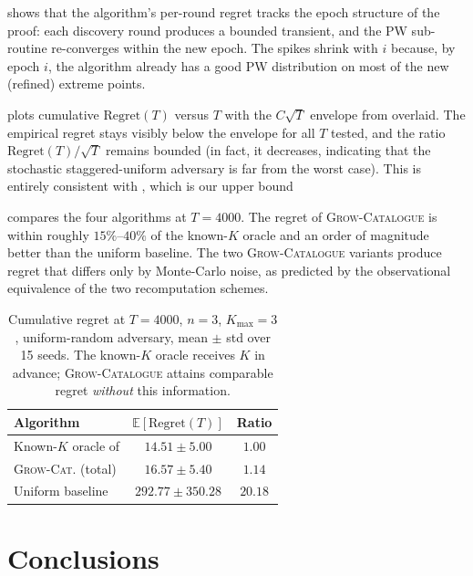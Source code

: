 \documentclass[letterpaper,9pt,twocolumn]{extarticle}
\newcommand{\EE}{\mathbb{E}}
\newcommand{\Kmax}{K_{\max}}
\newcommand{\Regret}{\mathrm{Regret}}
\theoremstyle{plain}
\theoremstyle{definition}
\theoremstyle{remark}
\begin{document}
 shows that the algorithm's per-round regret tracks
the epoch structure of the proof: each discovery round produces a bounded
transient, and the PW sub-routine re-converges within the new epoch. The
spikes shrink with $i$ because, by epoch $i$, the algorithm already has a
good PW distribution on most of the new (refined) extreme points.

 plots cumulative $\Regret(T)$ versus $T$ with the
$C\sqrt T$ envelope from  overlaid. The empirical regret
stays visibly below the envelope for all $T$ tested, and the ratio
$\Regret(T)/\sqrt T$ remains bounded (in fact, it decreases, indicating
that the stochastic staggered-uniform adversary is far from the worst
case). This is entirely consistent with , which is our upper bound

 compares the four algorithms at $T=4000$. The regret
of \textsc{Grow-Catalogue} is
within roughly $15\%$--$40\%$ of the known-$K$ oracle and an order of
magnitude better than the uniform baseline. The two \textsc{Grow-Catalogue}
variants produce regret that differs only by Monte-Carlo noise, as
predicted by the observational equivalence of the two recomputation
schemes.

\begin{table}[h]
\centering
\footnotesize
\renewcommand{\arraystretch}{1.15}
\begin{tabular}{lcc}
\toprule
Algorithm & $\EE[\Regret(T)]$ & Ratio\\
\midrule
Known-$K$ oracle of \citet{balcan2015} & $14.51\pm 5.00$  & $1.00$\\
\textsc{Grow-Cat.} (total)     & $16.57\pm 5.40$  & $1.14$\\
Uniform baseline               & $292.77\pm 350.28$ & $20.18$\\
\bottomrule
\end{tabular}
\caption{Cumulative regret at $T=4000$, $n=3$, $\Kmax=3$, uniform-random
adversary, mean $\pm$ std over 15 seeds. The known-$K$ oracle receives
$K$ in advance; \textsc{Grow-Catalogue} attains comparable regret
\emph{without} this information.}
\label{tab:comparison}
\end{table}

\section{Conclusions}
\label{sec:conc}
\end{document}
